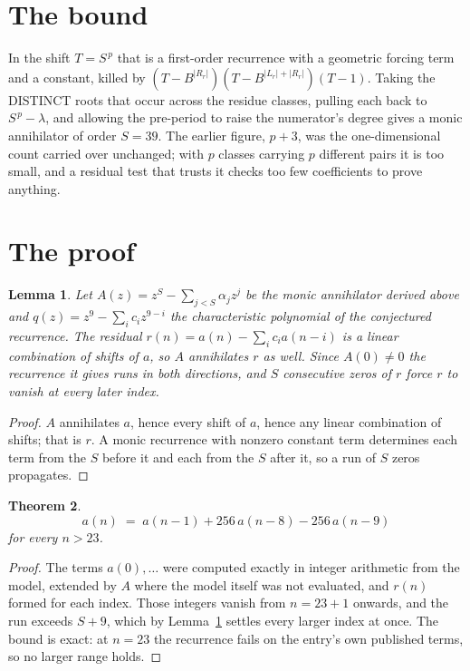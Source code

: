 \documentclass[11pt,a4paper]{article}
\theoremstyle{plain}
\newtheorem{theorem}{Theorem}
\newtheorem{lemma}[theorem]{Lemma}
\theoremstyle{definition}
\begin{document}
\section{The bound}

In the shift $T=S^{\,p}$ that is a first-order recurrence with a geometric forcing term and a
constant, killed by $(T-B^{|R_r|})(T-B^{|L_r|+|R_r|})(T-1)$. Taking the DISTINCT roots that
occur across the residue classes, pulling each back to $S^{\,p}-\lambda$, and allowing the
pre-period to raise the numerator's degree gives a monic annihilator of order $S=39$. The
earlier figure, $p+3$, was the one-dimensional count carried over unchanged; with $p$ classes
carrying $p$ different pairs it is too small, and a residual test that trusts it checks too few
coefficients to prove anything.

\section{The proof}

\begin{lemma}\label{lem:crit}
Let $A(z)=z^S-\sum_{j<S}\alpha_jz^{j}$ be the monic annihilator derived above and
$q(z)=z^{9}-\sum_ic_iz^{9-i}$ the characteristic polynomial of the conjectured
recurrence. The residual $r(n)=a(n)-\sum_ic_ia(n-i)$ is a linear combination of shifts of $a$,
so $A$ annihilates $r$ as well. Since $A(0)\ne0$ the recurrence it gives runs in both
directions, and $S$ consecutive zeros of $r$ force $r$ to vanish at every later index.
\end{lemma}

\begin{proof}
$A$ annihilates $a$, hence every shift of $a$, hence any linear combination of shifts; that is
$r$. A monic recurrence with nonzero constant term determines each term from the $S$ before it
and each from the $S$ after it, so a run of $S$ zeros propagates.
\end{proof}

\begin{theorem}
\[
a(n)\;=\;a(n-1) + 256\,a(n-8) - 256\,a(n-9)
\]
for every $n>23$.
\end{theorem}

\begin{proof}
The terms $a(0),\dots$ were computed exactly in integer arithmetic from the model, extended by
$A$ where the model itself was not evaluated, and $r(n)$ formed for each index. Those integers
vanish from $n=23+1$ onwards, and the run exceeds $S+9$, which by
Lemma~\ref{lem:crit} settles every larger index at once. The bound is exact: at $n=23$ the recurrence fails on the entry's own published terms, so no larger range holds.
\end{proof}
\end{document}
